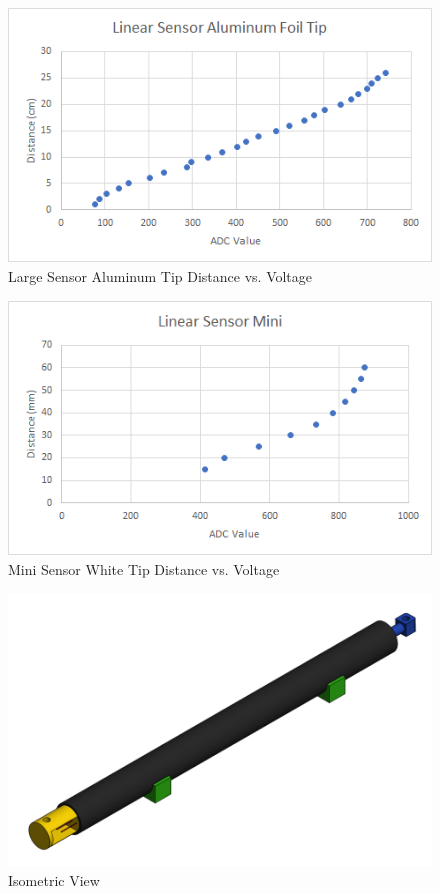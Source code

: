 \documentclass[10pt,conference,compsocconf]{IEEEtran}
\begin{document}
\begin{figure}
  \centering
  \includegraphics[width=\textwidth]{figures/AluminumLargeFoil.png}
  \caption{Large Sensor Aluminum Tip Distance vs. Voltage}  
\end{figure}

\begin{figure}
  \centering
  \includegraphics[width=\textwidth]{figures/MiniDistanceVsRead.png}
  \caption{Mini Sensor White Tip Distance vs. Voltage}  
\end{figure}

\begin{figure}
  \centering
  \includegraphics[width=\textwidth]{figures/IsometricView.png}
  \caption{Isometric View}  
\end{figure}
\end{document}
